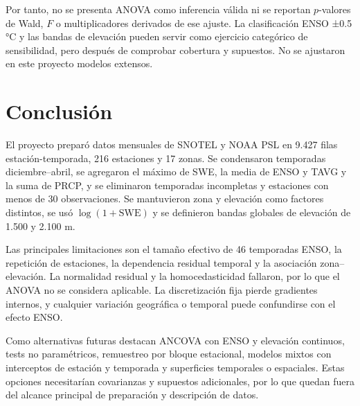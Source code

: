 \documentclass{article}
\begin{document}
Por tanto, no se presenta ANOVA como inferencia válida ni se reportan $p$-valores de Wald, $F$ o multiplicadores derivados de ese ajuste. La clasificación ENSO ±0.5 °C y las bandas de elevación pueden servir como ejercicio categórico de sensibilidad, pero después de comprobar cobertura y supuestos. No se ajustaron en este proyecto modelos extensos.

\section{Conclusión}
El proyecto preparó datos mensuales de SNOTEL y NOAA PSL en 9.427 filas estación-temporada, 216 estaciones y 17 zonas. Se condensaron temporadas diciembre--abril, se agregaron el máximo de SWE, la media de ENSO y TAVG y la suma de PRCP, y se eliminaron temporadas incompletas y estaciones con menos de 30 observaciones. Se mantuvieron zona y elevación como factores distintos, se usó $\log(1+\mathrm{SWE})$ y se definieron bandas globales de elevación de 1.500 y 2.100 m.

Las principales limitaciones son el tamaño efectivo de 46 temporadas ENSO, la repetición de estaciones, la dependencia residual temporal y la asociación zona--elevación. La normalidad residual y la homocedasticidad fallaron, por lo que el ANOVA no se considera aplicable. La discretización fija pierde gradientes internos, y cualquier variación geográfica o temporal puede confundirse con el efecto ENSO.

Como alternativas futuras destacan ANCOVA con ENSO y elevación continuos, tests no paramétricos, remuestreo por bloque estacional, modelos mixtos con interceptos de estación y temporada y superficies temporales o espaciales. Estas opciones necesitarían covarianzas y supuestos adicionales, por lo que quedan fuera del alcance principal de preparación y descripción de datos.

\begingroup\footnotesize
\raggedright
\end{document}
